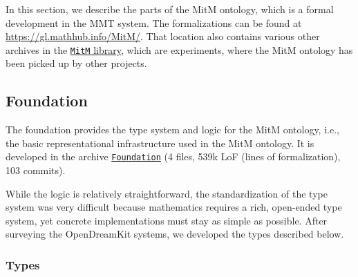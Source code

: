 \newcommand{\fold}[2]{\let\@tmpop=\relax\@for\@I:=#2\do{\@tmpop\@I\let\@tmpop=#1}}
\newcommand{\record}[1]{\{\fold{,}{#1}\}}
\newcommand{\union}[1]{[\fold{,}{#1}]}
\newcommand{\sq}{\subseteq}

In this section, we describe the parts of the MitM ontology, which is a formal development in the MMT system.
The formalizations can be found at \url{https://gl.mathhub.info/MitM/}.
That location also contains various other archives in the \href{https://gl.mathhub.info/MitM/}{\texttt{MitM} library}, which are experiments, where the MitM ontology has been picked up by other projects.


\subsection{Foundation}


The foundation provides the type system and logic for the MitM ontology, i.e., the basic representational infrastructure used in the MitM ontology.
It is developed in the archive  \href{https://gl.mathhub.info/MitM/Foundation}{\texttt{Foundation}} (4 files, 539k LoF (lines
of formalization), 103 commits).

While the logic is relatively straightforward, the standardization of
the type system was very difficult because mathematics requires a
rich, open-ended type system, yet concrete implementations must stay as simple as possible.
After surveying the OpenDreamKit systems, we developed the types described below.


\subsubsection{Types}

